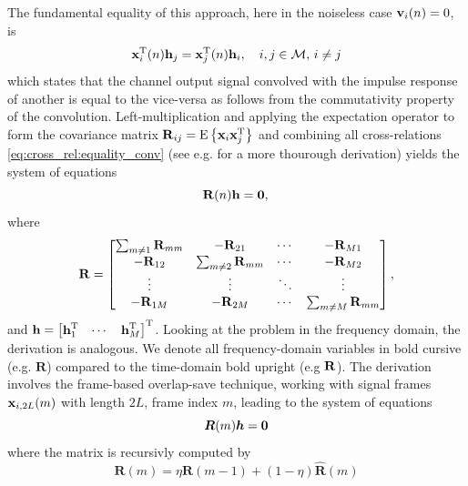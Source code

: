 \documentclass{article}
\newcommand{\h}{\mtxb{h}}
\newcommand{\x}{\mtxb{x}}
\newcommand{\R}{\mtxb{R}}
\newcommand{\hf}{{\bm{h}}}
\newcommand{\Rf}{{\bm{{R}}}}
\newcommand{\Mset}{\mathcal{M}}
\begin{document}
The fundamental equality of this approach, here in the noiseless case \(\bm{\mathrm{v}}_i(n) = 0\), is 
\begin{equation}
    \x_i^{\T}(n) \h_j = \x_j^{\T}(n) \h_i,\quad i,j \in \Mset,\,i\neq j\label{eq:cross_rel:equality_conv}
\end{equation}
which states that the channel output signal convolved with the impulse response of another is equal to the vice-versa as follows from the commutativity property of the convolution.
Left-multiplication and applying the expectation operator to form the covariance matrix \(\R_{ij} = \ev{\x_i \x_j^\T}\) and combining all cross-relations \eqref{eq:cross_rel:equality_conv} (see e.g. \cite{huangAdaptiveMultichannelLeast2002} for a more thourough derivation) yields the system of equations  
\begin{equation}
    \R(n) \h = \bm{0}, \label{eq:cross_rel:null_space}\\
\end{equation}
where 
\begin{equation}
    \R = \begin{bmatrix}
        \sum_{m \neq 1} \R_{mm} & -\R_{21} & \cdots & -\R_{M1}\\
        -\R_{12} & \sum_{m \neq 2} \R_{mm} & \cdots & -\R_{M2}\\
        \vdots & \vdots & \ddots & \vdots\\
        -\R_{1M} & -\R_{2M} & \cdots & \sum_{m \neq M} \R_{mm}\\
    \end{bmatrix},\label{eq:cross_rel:data_matrix}
\end{equation}
and \(\h = \begin{bmatrix}
    \h_1^\T & \cdots & \h_M^\T
\end{bmatrix}^\T\).
Looking at the problem in the frequency domain, the derivation is analogous. We denote all frequency-domain variables in bold cursive (e.g. \(\Rf\)) compared to the time-domain bold upright (e.g \(\R\)). The derivation involves the frame-based overlap-save technique, working with signal frames \(\x_{i,2L}(m)\) with length \(2L\), frame index \(m\), leading to the system of equations 
\begin{equation}
    \Rf(m) \hf = \bm{0} \label{eq:frequency_domain:null_space}\\
\end{equation}
where the matrix is recursivly computed by \begin{equation}
    \Rf(m) = \eta \Rf(m-1) + (1-\eta )\hat{\Rf}(m)
\end{equation}
\end{document}
